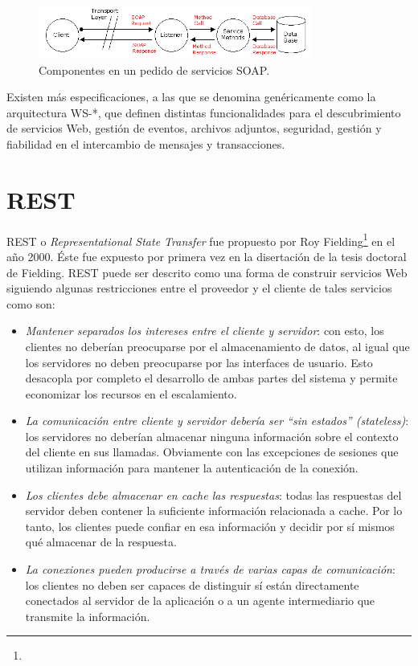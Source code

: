 \documentclass[conference]{IEEEtran}
\begin{document}
\begin{figure}[!t]
\centering
  \includegraphics[width=0.8\textwidth]{img/soap-comp}
  \caption{Componentes en un pedido de servicios SOAP.}
  \label{fig:soap-comp}
\end{figure}

Existen más especificaciones, a las que se denomina genéricamente como
la arquitectura WS-*, que definen distintas funcionalidades para el
descubrimiento de servicios Web, gestión de eventos, archivos
adjuntos, seguridad, gestión y fiabilidad en el intercambio de
mensajes y transacciones. 

\section{REST}
\label{sec:soap}

REST o \textsl{Representational State Transfer} fue propuesto por Roy
Fielding\footnote{} en el
año 2000. Éste fue expuesto por primera vez en la disertación
de la tesis doctoral de Fielding. REST
puede ser descrito como una forma de construir servicios Web siguiendo
algunas restricciones entre el proveedor y el cliente de tales
servicios como son\cite{NordicAPIs}:

\begin{itemize}
\item \emph{Mantener separados los intereses entre el cliente y
    servidor}: con esto, los clientes no deberían preocuparse por el
  almacenamiento de datos, al igual que los servidores no deben
  preocuparse por las interfaces de usuario. Esto desacopla por completo
  el desarrollo de ambas partes del sistema y permite economizar los
  recursos en el escalamiento.
\item \emph{La comunicación entre cliente y servidor debería ser ``sin
    estados'' (stateless)}: los servidores no deberían almacenar ninguna
  información sobre el contexto del cliente en sus llamadas. Obviamente
  con las excepciones de sesiones que utilizan información para mantener
  la autenticación de la conexión.
\item \emph{Los clientes debe almacenar en cache las respuestas}:
  todas las respuestas del servidor deben contener la suficiente
  información relacionada a cache. Por lo tanto, los clientes puede
  confiar en esa información y decidir por sí mismos qué almacenar de la
  respuesta.
\item \emph{La conexiones pueden producirse a través de varias capas
    de comunicación}: los clientes no deben ser capaces de distinguir sí
  están directamente conectados al servidor de la aplicación o a un
  agente intermediario que transmite la información.
\end{itemize}
\end{document}

